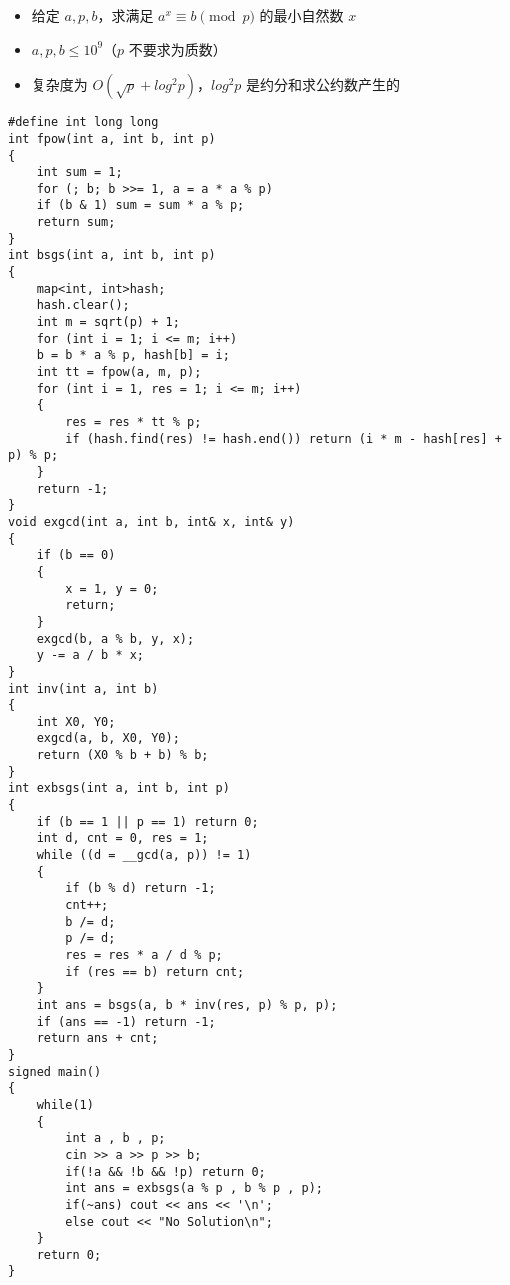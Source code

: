 \documentclass[E:/GsjzTle/main/main.tex]{subfiles}
\begin{document}
\begin{itemize}
\item
  给定 \(a,p,b\)，求满足 \(a^x≡b \pmod p\) 的最小自然数 \(x\)
\item
  \(a,p,b≤10^9\)（\(p\) 不要求为质数）
\item
  复杂度为 \(O(\sqrt{p} + log^2p)\)，\(log^2p\) 是约分和求公约数产生的
\end{itemize}

\begin{lstlisting}
#define int long long
int fpow(int a, int b, int p)
{
	int sum = 1;
	for (; b; b >>= 1, a = a * a % p)
	if (b & 1) sum = sum * a % p;
	return sum;
}
int bsgs(int a, int b, int p)
{
	map<int, int>hash;
	hash.clear();
	int m = sqrt(p) + 1;
	for (int i = 1; i <= m; i++)
	b = b * a % p, hash[b] = i;
	int tt = fpow(a, m, p);
	for (int i = 1, res = 1; i <= m; i++)
	{
		res = res * tt % p;
		if (hash.find(res) != hash.end()) return (i * m - hash[res] + p) % p;
	}
	return -1;
}
void exgcd(int a, int b, int& x, int& y)
{
	if (b == 0)
	{
		x = 1, y = 0;
		return;
	}
	exgcd(b, a % b, y, x);
	y -= a / b * x;
}
int inv(int a, int b)
{
	int X0, Y0;
	exgcd(a, b, X0, Y0);
	return (X0 % b + b) % b;
}
int exbsgs(int a, int b, int p)
{
	if (b == 1 || p == 1) return 0;
	int d, cnt = 0, res = 1;
	while ((d = __gcd(a, p)) != 1)
	{
		if (b % d) return -1;
		cnt++;
		b /= d;
		p /= d;
		res = res * a / d % p;
		if (res == b) return cnt;
	}
	int ans = bsgs(a, b * inv(res, p) % p, p);
	if (ans == -1) return -1;
	return ans + cnt;
}
signed main()
{
	while(1)
	{
		int a , b , p;
		cin >> a >> p >> b;
		if(!a && !b && !p) return 0;
		int ans = exbsgs(a % p , b % p , p);
		if(~ans) cout << ans << '\n';
		else cout << "No Solution\n";
	}
	return 0;
}
\end{lstlisting}
\end{document}
